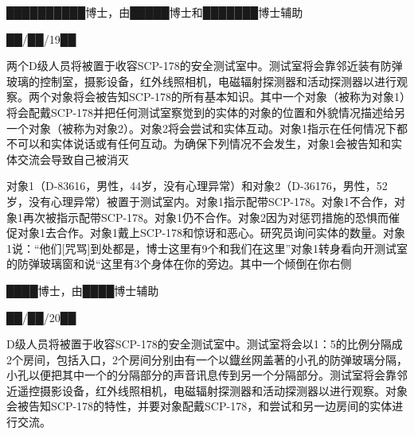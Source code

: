 
\hr


██████████博士，由█████博士和███████博士辅助

██\slash ██\slash 19██

两个D级人员将被置于收容SCP-178的安全测试室中。测试室将会靠邻近装有防弹玻璃的控制室，摄影设备，红外线照相机，电磁辐射探测器和活动探测器以进行观察。两个对象将会被告知SCP-178的所有基本知识。其中一个对象（被称为对象1）将会配戴SCP-178并把任何测试室察觉到的实体的对象的位置和外貌情况描述给另一个对象（被称为对象2）。对象2将会尝试和实体互动。对象1指示在任何情况下都不可以和实体说话或有任何互动。为确保下列情况不会发生，对象1会被告知和实体交流会导致自己被消灭

对象1（D-83616，男性，44岁，没有心理异常）和对象2（D-36176，男性，52岁，没有心理异常）被置于测试室内。对象1指示配带SCP-178。对象1不合作，对象1再次被指示配带SCP-178。对象1仍不合作。对象2因为对惩罚措施的恐惧而催促对象1去合作。对象1戴上SCP-178和惊讶和恶心。研究员询问实体的数量。对象1说：“他们{[}咒骂]到处都是，博士这里有9个和我们在这里”对象1转身看向开测试室的防弹玻璃窗和说“这里有3个身体在你的旁边。其中一个倾倒在你右侧


\hr


████博士，由████博士辅助

██\slash ██\slash 20██

D级人员将被置于收容SCP-178的安全测试室中。测试室将会以1：5的比例分隔成2个房间，包括入口，2个房间分别由有一个以鐡丝网盖著的小孔的防弹玻璃分隔，小孔以便把其中一个的分隔部分的声音讯息传到另一个分隔部分。测试室将会靠邻近遥控摄影设备，红外线照相机，电磁辐射探测器和活动探测器以进行观察。对象会被告知SCP-178的特性，并要对象配戴SCP-178，和尝试和另一边房间的实体进行交流。

